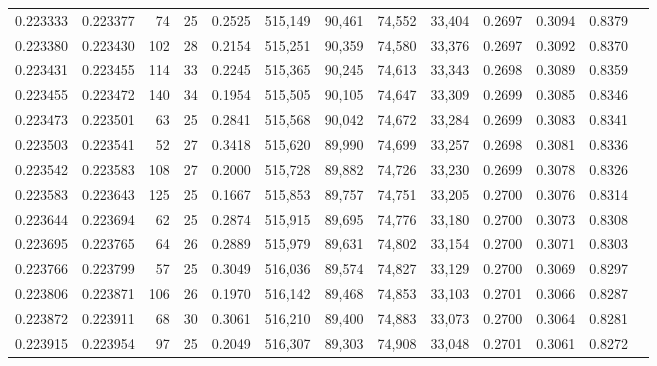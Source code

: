 \begin{tabular}{rrrrrrrrrrrrr}
0.223333 & 0.223377 &  74 &  25 &                                     0.2525 & 515,149 &  90,461 &  74,552 &  33,404 & 0.2697 & 0.3094 & 0.8379 \\
0.223380 & 0.223430 & 102 &  28 &                                     0.2154 & 515,251 &  90,359 &  74,580 &  33,376 & 0.2697 & 0.3092 & 0.8370 \\
0.223431 & 0.223455 & 114 &  33 &                                     0.2245 & 515,365 &  90,245 &  74,613 &  33,343 & 0.2698 & 0.3089 & 0.8359 \\
0.223455 & 0.223472 & 140 &  34 &                                     0.1954 & 515,505 &  90,105 &  74,647 &  33,309 & 0.2699 & 0.3085 & 0.8346 \\
0.223473 & 0.223501 &  63 &  25 &                                     0.2841 & 515,568 &  90,042 &  74,672 &  33,284 & 0.2699 & 0.3083 & 0.8341 \\
0.223503 & 0.223541 &  52 &  27 &                                     0.3418 & 515,620 &  89,990 &  74,699 &  33,257 & 0.2698 & 0.3081 & 0.8336 \\
0.223542 & 0.223583 & 108 &  27 &                                     0.2000 & 515,728 &  89,882 &  74,726 &  33,230 & 0.2699 & 0.3078 & 0.8326 \\
0.223583 & 0.223643 & 125 &  25 &                                     0.1667 & 515,853 &  89,757 &  74,751 &  33,205 & 0.2700 & 0.3076 & 0.8314 \\
0.223644 & 0.223694 &  62 &  25 &                                     0.2874 & 515,915 &  89,695 &  74,776 &  33,180 & 0.2700 & 0.3073 & 0.8308 \\
0.223695 & 0.223765 &  64 &  26 &                                     0.2889 & 515,979 &  89,631 &  74,802 &  33,154 & 0.2700 & 0.3071 & 0.8303 \\
0.223766 & 0.223799 &  57 &  25 &                                     0.3049 & 516,036 &  89,574 &  74,827 &  33,129 & 0.2700 & 0.3069 & 0.8297 \\
0.223806 & 0.223871 & 106 &  26 &                                     0.1970 & 516,142 &  89,468 &  74,853 &  33,103 & 0.2701 & 0.3066 & 0.8287 \\
0.223872 & 0.223911 &  68 &  30 &                                     0.3061 & 516,210 &  89,400 &  74,883 &  33,073 & 0.2700 & 0.3064 & 0.8281 \\
0.223915 & 0.223954 &  97 &  25 &                                     0.2049 & 516,307 &  89,303 &  74,908 &  33,048 & 0.2701 & 0.3061 & 0.8272 \\

\end{tabular}
